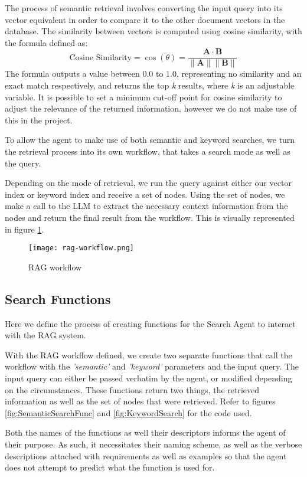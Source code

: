 The process of semantic retrieval involves converting the input query into its vector equivalent in order to compare it to the other document vectors in the database. The similarity between vectors is computed using cosine similarity, with the formula defined as:
\[
	\text{Cosine Similarity} = \cos(\theta) = \frac{\mathbf{A} \cdot \mathbf{B}}{\|\mathbf{A}\| \|\mathbf{B}\|}
\]
The formula outputs a value between 0.0 to 1.0, representing no similarity and an exact match respectively, and returns the top \textit{k} results, where \textit{k} is an adjustable variable.
It is possible to set a minimum cut-off point for cosine similarity to adjust the relevance of the returned information, however we do not make use of this in the project.

To allow the agent to make use of both semantic and keyword searches, we turn the retrieval process into its own workflow, that takes a search mode as well as the query.

Depending on the mode of retrieval, we run the query against either our vector index or keyword index and receive a set of nodes. Using the set of nodes, we make a call to the LLM to extract the necessary context information from the nodes and return the final result from the workflow.
This is visually represented in figure \ref{fig:RagWorkflow}.

\begin{figure}[ht]
	\centering
	\texttt{[image: rag-workflow.png]}
	\caption{RAG workflow}
	\label{fig:RagWorkflow}
\end{figure}


\subsection{Search Functions}
Here we define the process of creating functions for the Search Agent to interact with the RAG system.

With the RAG workflow defined, we create two separate functions that call the workflow with the \textit{'semantic'} and \textit{'keyword'} parameters and the input query. The input query can either be passed verbatim by the agent, or modified depending on the circumstances. These functions return two things, the retrieved information as well as the set of nodes that were retrieved. Refer to figures \ref{fig:SemanticSearchFunc} and
\ref{fig:KeywordSearch} for the code used.

Both the names of the functions as well their descriptors informs the agent of their purpose. As such, it necessitates their naming scheme, as well as the verbose descriptions attached with requirements as well as examples so that the agent does not attempt to predict what the function is used for.

